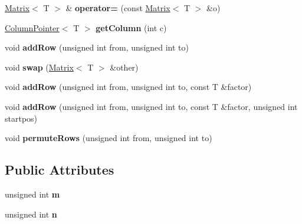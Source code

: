 \begin{DoxyCompactItemize}
\mbox{\label{classcore_1_1_matrix_a190c9ba75a1dbc8a6d611695345654d2}} 
\mbox{\hyperlink{classcore_1_1_matrix}{Matrix}}$<$ T $>$ \& {\bfseries operator=} (const \mbox{\hyperlink{classcore_1_1_matrix}{Matrix}}$<$ T $>$ \&o)
\item 
\mbox{\label{classcore_1_1_matrix_a64da6958d83cc9db3b824319d2af667d}} 
\mbox{\hyperlink{classcore_1_1_column_pointer}{Column\+Pointer}}$<$ T $>$ {\bfseries get\+Column} (int c)
\item 
\mbox{\label{classcore_1_1_matrix_a983910678c3ad5019eb23807cb7dcf19}} 
void {\bfseries add\+Row} (unsigned int from, unsigned int to)
\item 
\mbox{\label{classcore_1_1_matrix_a7b66fe039eb29ea15d74528f52e3f307}} 
void {\bfseries swap} (\mbox{\hyperlink{classcore_1_1_matrix}{Matrix}}$<$ T $>$ \&other)
\item 
\mbox{\label{classcore_1_1_matrix_a3a2a937b8411fd750a2dee57ddc20823}} 
void {\bfseries add\+Row} (unsigned int from, unsigned int to, const T \&factor)
\item 
\mbox{\label{classcore_1_1_matrix_a0b18ec1f633edab803be8c532ba4c21f}} 
void {\bfseries add\+Row} (unsigned int from, unsigned int to, const T \&factor, unsigned int startpos)
\item 
\mbox{\label{classcore_1_1_matrix_ad4686ea829f17acd83e4cc6e5cdc2fe0}} 
void {\bfseries permute\+Rows} (unsigned int from, unsigned int to)
\end{DoxyCompactItemize}
\subsection*{Public Attributes}
\begin{DoxyCompactItemize}
\item 
\mbox{\label{classcore_1_1_matrix_a6897a963f7030ab4bc812d506ebe501f}} 
unsigned int {\bfseries m}
\item 
\mbox{\label{classcore_1_1_matrix_afd4b718e20b4a0605ebe45730c41da7a}} 
unsigned int {\bfseries n}
\end{DoxyCompactItemize}

